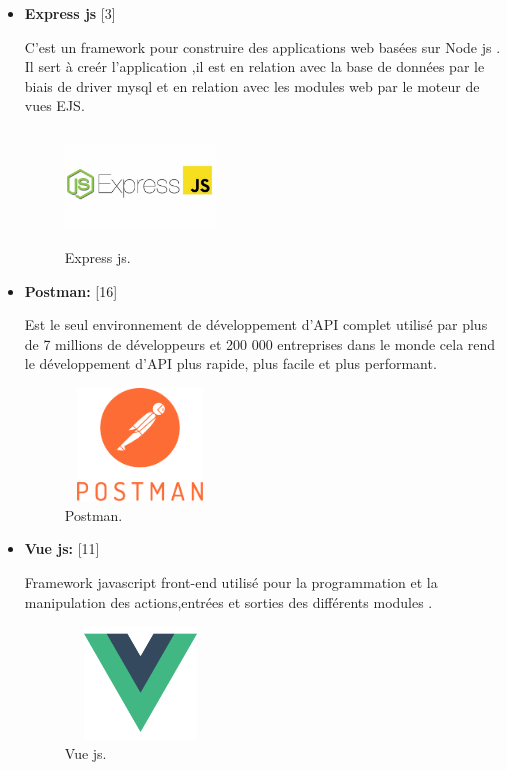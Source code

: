 \begin{itemize}
\item {  \textbf{ Express js} } [3]



 C'est un framework pour construire des
 applications web bas\'{e}es sur Node js .
 Il  sert \`{a} cre\'{e}r l'application ,il est en
relation avec la base de donn\'{e}es par le biais de driver mysql et en relation
avec les modules web par le moteur de vues EJS.\newline


\FloatBarrier
\begin{figure}[H]
\center
\includegraphics[width=4cm,height=3cm]{./figures/teklogos/express.png}
\caption{Express js.}
\end{figure}
\FloatBarrier



\item {  \textbf{ Postman:} } [16]


Est le seul environnement de d\'{e}veloppement d'API complet utilis\'{e} par plus de 7 millions
de d\'{e}veloppeurs et 200 000 entreprises dans le monde
cela rend le d\'{e}veloppement d'API plus rapide,
 plus facile et plus performant.

\FloatBarrier
\begin{figure}[H]
\center
\includegraphics[width=4cm,height=3cm]{./figures/teklogos/postman.png}
\caption{Postman.}
\end{figure}
\FloatBarrier

\item {  \textbf{ Vue js:} } [11]

Framework javascript front-end utilis\'{e} pour la programmation et la
manipulation des actions,entr\'{e}es et sorties des diff\'{e}rents modules . \newline
\FloatBarrier
\begin{figure}[H]
\center
\includegraphics[width=4cm,height=3cm]{./figures/teklogos/vue.png}
\caption{Vue js.}
\end{figure}
\FloatBarrier


\end{itemize}
